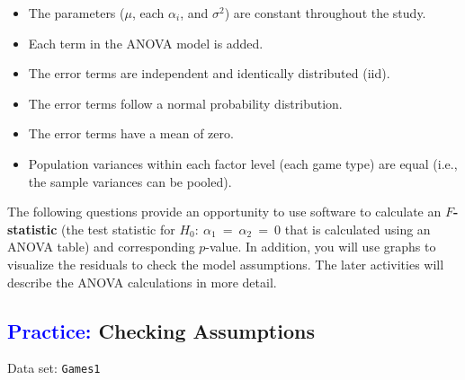 \documentclass[
]{report}
\begin{document}
\begin{itemize}
\item The parameters ($\scriptstyle \mu$, each $\scriptstyle \alpha_i$, and $\scriptstyle \sigma^2$) are constant throughout the study.
\item Each term in the ANOVA model is added.
\item The error terms are independent and identically distributed (iid).
\item The error terms follow a normal probability distribution.
\item The error terms have a mean of zero.
\item Population variances within each factor level (each game type) are equal (i.e., the sample variances can be pooled).
\end{itemize}

The following questions provide an opportunity to use software to calculate an \textbf{\(\scriptstyle F\)-statistic} (the test statistic for \(\scriptstyle H_0:\  \alpha_1 \ =\  \alpha_2 \ =\  0\) that is calculated using an ANOVA table) and corresponding \(\scriptstyle p\)-value. In addition, you will use graphs to visualize the residuals to check the model assumptions. The later activities will describe the ANOVA calculations in more detail.

\hypertarget{checking-assumptions}{%
\subsection*{\texorpdfstring{\textcolor{blue}{Practice:} Checking Assumptions}{ Checking Assumptions}}\label{checking-assumptions}}

\vspace{-1em}

Data set: \texttt{Games1}
\end{document}
